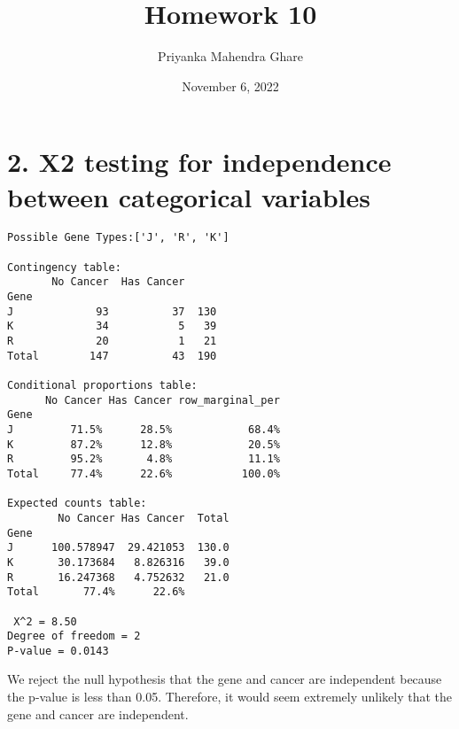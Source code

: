 \documentclass[11pt]{article}
\title{Homework 10}
\author{Priyanka Mahendra Ghare}
\date{November 6, 2022}
\begin{document}
\maketitle

\section*{2. X2 testing for independence between categorical variables}

\begin{verbatim}
Possible Gene Types:['J', 'R', 'K']

Contingency table:
       No Cancer  Has Cancer
Gene
J             93          37  130
K             34           5   39
R             20           1   21
Total        147          43  190

Conditional proportions table:
      No Cancer Has Cancer row_marginal_per
Gene
J         71.5%      28.5%            68.4%
K         87.2%      12.8%            20.5%
R         95.2%       4.8%            11.1%
Total     77.4%      22.6%           100.0%

Expected counts table:
        No Cancer Has Cancer  Total
Gene
J      100.578947  29.421053  130.0
K       30.173684   8.826316   39.0
R       16.247368   4.752632   21.0
Total       77.4%      22.6%

 X^2 = 8.50
Degree of freedom = 2
P-value = 0.0143
\end{verbatim}
We reject the null hypothesis that the gene and cancer are independent because the p-value is less than 0.05. Therefore, it would seem extremely unlikely that the gene and cancer are independent.
\end{document}
